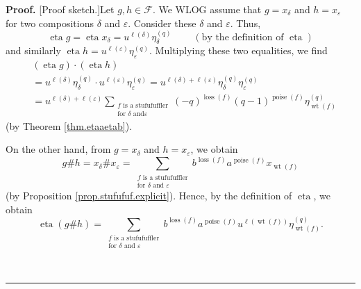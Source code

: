 \documentclass[numbers=enddot,12pt,final,onecolumn,notitlepage]{scrartcl}%
\theoremstyle{definition}
\newenvironment{proof}[1][Proof]{\noindent\textbf{#1.} }{\ \rule{0.5em}{0.5em}}
\let\sumnonlimits\sum
\renewcommand{\sum}{\sumnonlimits\limits}
\begin{document}
\begin{proof}
[Proof sketch.]Let $g,h\in\mathcal{F}$. We WLOG assume that $g=x_{\delta}$ and
$h=x_{\varepsilon}$ for two compositions $\delta$ and $\varepsilon$. Consider
these $\delta$ and $\varepsilon$. Thus,%
\[
\operatorname*{eta}g=\operatorname*{eta}x_{\delta}=u^{\ell\left(
\delta\right)  }\eta_{\delta}^{\left(  q\right)  }\ \ \ \ \ \ \ \ \ \ \left(
\text{by the definition of }\operatorname*{eta}\right)
\]
and similarly $\operatorname*{eta}h=u^{\ell\left(  \varepsilon\right)  }%
\eta_{\varepsilon}^{\left(  q\right)  }$. Multiplying these two equalities, we
find%
\begin{align}
&  \left(  \operatorname*{eta}g\right)  \cdot\left(  \operatorname*{eta}%
h\right) \nonumber\\
&  =u^{\ell\left(  \delta\right)  }\eta_{\delta}^{\left(  q\right)  }\cdot
u^{\ell\left(  \varepsilon\right)  }\eta_{\varepsilon}^{\left(  q\right)
}=u^{\ell\left(  \delta\right)  +\ell\left(  \varepsilon\right)  }\eta
_{\delta}^{\left(  q\right)  }\eta_{\varepsilon}^{\left(  q\right)
}\nonumber\\
&  =u^{\ell\left(  \delta\right)  +\ell\left(  \varepsilon\right)  }%
\sum_{\substack{f\text{ is a stufufuffler}\\\text{for }\delta\text{ and
}\varepsilon}}\left(  -q\right)  ^{\operatorname*{loss}\left(  f\right)
}\left(  q-1\right)  ^{\operatorname*{poise}\left(  f\right)  }\eta
_{\operatorname*{wt}\left(  f\right)  }^{\left(  q\right)  }
\label{pf.prop.stufufuf.eta.1}%
\end{align}
(by Theorem \ref{thm.etaaetab}).

On the other hand, from $g=x_{\delta}$ and $h=x_{\varepsilon}$, we obtain%
\[
g\#h=x_{\delta}\#x_{\varepsilon}=\sum_{\substack{f\text{ is a stufufuffler}%
\\\text{for }\delta\text{ and }\varepsilon}}b^{\operatorname*{loss}\left(
f\right)  }a^{\operatorname*{poise}\left(  f\right)  }x_{\operatorname*{wt}%
\left(  f\right)  }%
\]
(by Proposition \ref{prop.stufufuf.explicit}). Hence, by the definition of
$\operatorname*{eta}$, we obtain%
\begin{equation}
\operatorname*{eta}\left(  g\#h\right)  =\sum_{\substack{f\text{ is a
stufufuffler}\\\text{for }\delta\text{ and }\varepsilon}%
}b^{\operatorname*{loss}\left(  f\right)  }a^{\operatorname*{poise}\left(
f\right)  }u^{\ell\left(  \operatorname*{wt}\left(  f\right)  \right)  }%
\eta_{\operatorname*{wt}\left(  f\right)  }^{\left(  q\right)  }.
\label{pf.prop.stufufuf.eta.2}%
\end{equation}



\end{proof}
\end{document}
